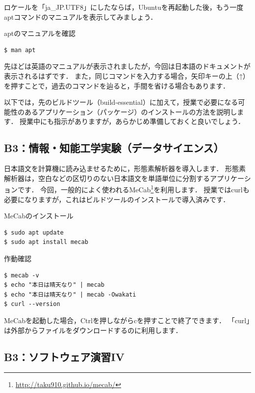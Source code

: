 \documentclass[dvipdfmx]{jarticle}
\begin{document}
ロケールを「ja\_JP.UTF8」にしたならば，Ubuntuを再起動した後，もう一度aptコマンドのマニュアルを表示してみましょう．
\begin{itembox}[l]{aptのマニュアルを確認}
\begin{verbatim}
$ man apt
\end{verbatim}
\end{itembox}
先ほどは英語のマニュアルが表示されましたが，今回は日本語のドキュメントが表示されるはずです．
また，同じコマンドを入力する場合，矢印キーの上（↑）を押すことで，過去のコマンドを辿ると，手間を省ける場合もあります．


\vspace{15mm}
以下では，先のビルドツール（build-essential）に加えて，授業で必要になる可能性のあるアプリケーション（パッケージ）のインストールの方法を説明します．
授業中にも指示がありますが，あらかじめ準備しておくと良いでしょう．

\subsection{B3：情報・知能工学実験（データサイエンス）}

日本語文を計算機に読み込ませるために，形態素解析器を導入します．
形態素解析器は，空白などの区切りのない日本語文を単語単位に分割するアプリケーションです．
今回，一般的によく使われるMeCab\footnote{\url{http://taku910.github.io/mecab/}}を利用します．
授業ではcurlも必要になりますが，これはビルドツールのインストールで導入済みです．

\begin{itembox}[l]{MeCabのインストール}
\begin{verbatim}
$ sudo apt update
$ sudo apt install mecab
\end{verbatim}
\end{itembox}

\begin{itembox}[l]{作動確認}
\begin{verbatim}
$ mecab -v
$ echo "本日は晴天なり" | mecab
$ echo "本日は晴天なり" | mecab -Owakati
$ curl --version
\end{verbatim}
\end{itembox}

MeCabを起動した場合，Ctrlを押しながらcを押すことで終了できます．
「curl」は外部からファイルをダウンロードするのに利用します．

\subsection{B3：ソフトウェア演習IV}
\end{document}
